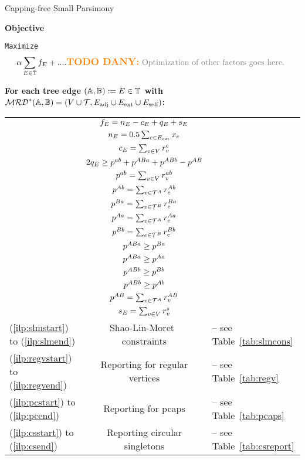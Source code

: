 \documentclass[runningheads]{llncs}
\begin{document}
\begin{algorithm}
\caption{Capping-free Small Parsimony}
\textbf{Objective}

\newcommand{\idx}{\texttt{ix}}
\hspace{0.5cm}\texttt{Maximize}
\begin{equation*}
    \alpha \sum_{\edt\in\tree} f_\edt + .... \text{\todoDany{Optimization of other factors goes here.}}
\end{equation*}

\textbf{For each tree edge $(\mathbb{A},\mathbb{B}):=E\in \mathbb{T}$ with $\mathcal{MRD}^*(\mathbb{A},\mathbb{B}) = (V\cup\mathcal{T}, E_\text{adj} \cup E_{\text{ext}} \cup E_\text{self})$:}

\begin{constraints}
\begin{tabular}{lcl}
	\cns & $f_E = n_E - c_E + q_E + s_E$\\
	\cns & $n_E = 0.5 \sum_{e \in E_{\text{ext}}} x_{e}$\\
    \cns & $c_E = \sum_{v\in V} r^c_{v}$\\
    \cns & $2q_E \geq p^{a b}+ p^{ABa} + p^{ABb} - p^{A B} $\\
    \cns & $p^{a b} = \sum_{v \in V}r^{a b}_{v}$\\
    \cns & $p^{A b} = \sum_{v \in \mathcal{T}^A} r^{A b}_e$\\
    \cns & $p^{B a} = \sum_{v\in \mathcal{T}^B} r^{B a}_e$\\
    \cns & $p^{A a} = \sum_{v \in \mathcal{T}^A} r^{A a}_e$\\
    \cns & $p^{B b} = \sum_{e \in \mathcal{T}^B} r^{B b}_e$\\
    \cns & $p^{ABa} \geq p^{B a}$\\
    \cns & $p^{ABa} \geq p^{A a}$\\
    \cns & $p^{ABb} \geq p^{B b}$\\
    \cns & $p^{ABb} \geq p^{A b}$\\
    \cns & $p^{A B} = \sum_{v\in \mathcal{T}^A} r^{A B}_v$\\
    \cns & $s_E = \sum_{v\in V} r^{s}_{v}$ \\
    (\ref{ilp:slmstart}) to (\ref{ilp:slmend})& Shao-Lin-Moret~\cite{SHA-LIN-MOR-2015} constraints& -- see Table~\ref{tab:slmcons}\\
    (\ref{ilp:regvstart}) to (\ref{ilp:regvend})& Reporting for regular vertices& -- see Table~\ref{tab:regv}\\
    (\ref{ilp:pcstart}) to (\ref{ilp:pcend})& Reporting for \gls{pcaps}& -- see Table~\ref{tab:pcaps}\\
    (\ref{ilp:csstart}) to (\ref{ilp:csend})& Reporting circular singletons& --  see Table~\ref{tab:csreport}\\    
\end{tabular}

\end{constraints}
\end{algorithm}
\end{document}
